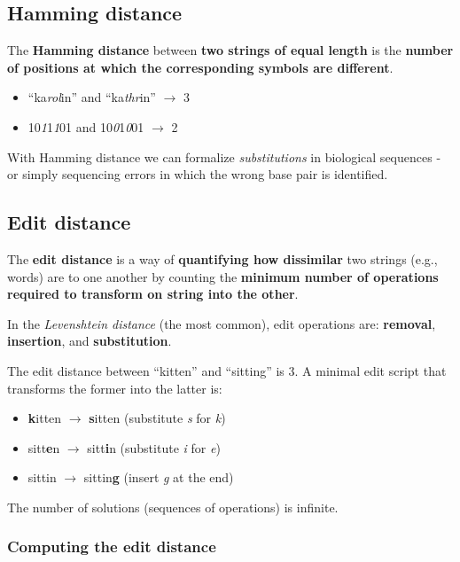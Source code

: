 \documentclass[12pt, letterpaper]{article}
\begin{document}
\subsection{Hamming distance}

The \textbf{Hamming distance} between \textbf{two strings of equal length} is the \textbf{number of positions at which the corresponding symbols are different}.

\begin{itemize}
\item ``ka\emph{rol}in'' and ``ka\emph{thr}in'' $\rightarrow$ 3
\item 10\emph{1}1\emph{1}01 and 10\emph{0}1\emph{0}01 $\rightarrow$ 2
\end{itemize}

With Hamming distance we can formalize \emph{substitutions} in biological sequences - or simply sequencing errors in which the wrong base pair is identified.

\subsection{Edit distance}

The \textbf{edit distance} is a way of \textbf{quantifying how dissimilar} two strings (e.g., words) are to one another by counting the \textbf{minimum number of operations required to transform on string into the other}.

In the \emph{Levenshtein distance} (the most common), edit operations are: \textbf{removal}, \textbf{insertion}, and \textbf{substitution}.

The edit distance between ``kitten'' and ``sitting'' is 3. A minimal edit script that transforms the former into the latter is:

\begin{itemize}
\item \textbf{k}itten $\rightarrow$ \textbf{s}itten (substitute \emph{s} for \emph{k})
\item sitt\textbf{e}n $\rightarrow$ sitt\textbf{i}n (substitute \emph{i} for \emph{e})
\item sittin $\rightarrow$ sittin\textbf{g} (insert \emph{g} at the end)
\end{itemize}

The number of solutions (sequences of operations) is infinite.

\subsubsection{Computing the edit distance}
\end{document}
